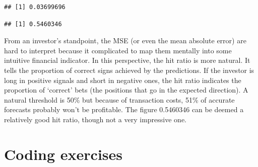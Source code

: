 \documentclass[]{krantz}
\makeatletter
\newenvironment{Shaded}{\begin{snugshade}}{\end{snugshade}}
\newcommand{\CommentTok}[1]{\textcolor[rgb]{0.37,0.37,0.37}{\textit{#1}}}
\newcommand{\DecValTok}[1]{\textcolor[rgb]{0.06,0.06,0.06}{#1}}
\newcommand{\KeywordTok}[1]{\textcolor[rgb]{0.27,0.27,0.27}{\textbf{#1}}}
\newcommand{\NormalTok}[1]{#1}
\newcommand{\OperatorTok}[1]{\textcolor[rgb]{0.43,0.43,0.43}{\textbf{#1}}}
\newcommand{\StringTok}[1]{\textcolor[rgb]{0.5,0.5,0.5}{#1}}
\newenvironment{kframe}{%
\medskip{}
\setlength{\fboxsep}{.8em}
 \def\at@end@of@kframe{}%
 \ifinner\ifhmode%
  \def\at@end@of@kframe{\end{minipage}}%
  \begin{minipage}{\columnwidth}%
 \fi\fi%
 \def\FrameCommand##1{\hskip\@totalleftmargin \hskip-\fboxsep
 \colorbox{shadecolor}{##1}\hskip-\fboxsep
     \hskip-\linewidth \hskip-\@totalleftmargin \hskip\columnwidth}%
 \MakeFramed {\advance\hsize-\width
   \@totalleftmargin\z@ \linewidth\hsize
   \@setminipage}}%
 {\par\unskip\endMakeFramed%
 \at@end@of@kframe}
\renewenvironment{Shaded}{\begin{kframe}}{\end{kframe}}
\theoremstyle{definition}
\theoremstyle{definition}
\theoremstyle{definition}
\theoremstyle{remark}
\makeatother
\begin{document}
\begin{Shaded}
\end{Shaded}

\begin{verbatim}
## [1] 0.03699696
\end{verbatim}

\begin{Shaded}
\end{Shaded}

\begin{verbatim}
## [1] 0.5460346
\end{verbatim}

\normalsize

From an investor's standpoint, the MSE (or even the mean absolute error)
are hard to interpret because it complicated to map them mentally into
some intuitive financial indicator. In this perspective, the hit ratio
is more natural. It tells the proportion of correct signs achieved by
the predictions. If the investor is long in positive signals and short
in negative ones, the hit ratio indicates the proportion of `correct'
bets (the positions that go in the expected direction). A natural
threshold is 50\% but because of transaction costs, 51\% of accurate
forecasts probably won't be profitable. The figure 0.5460346 can be
deemed a relatively good hit ratio, though not a very impressive one.

\hypertarget{coding-exercises-2}{%
\section{Coding exercises}\label{coding-exercises-2}}
\end{document}
